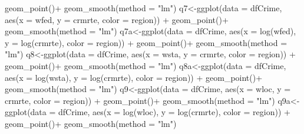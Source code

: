 \documentclass[]{article}
\newenvironment{Shaded}{}{}
\newcommand{\DataTypeTok}[1]{#1}
\newcommand{\KeywordTok}[1]{\textcolor[rgb]{0.00,0.00,1.00}{#1}}
\newcommand{\NormalTok}[1]{#1}
\newcommand{\OperatorTok}[1]{#1}
\newcommand{\StringTok}[1]{\textcolor[rgb]{0.00,0.50,0.50}{#1}}
\begin{document}
\begin{Shaded}
\begin{Highlighting}[]
\StringTok{      }\KeywordTok{geom_point}\NormalTok{()}\OperatorTok{+}
\StringTok{  }\KeywordTok{geom_smooth}\NormalTok{(}\DataTypeTok{method =} \StringTok{"lm"}\NormalTok{)}
\NormalTok{q7<-}\KeywordTok{ggplot}\NormalTok{(}\DataTypeTok{data =}\NormalTok{ dfCrime, }\KeywordTok{aes}\NormalTok{(}\DataTypeTok{x =}\NormalTok{ wfed, }\DataTypeTok{y =}\NormalTok{ crmrte, }\DataTypeTok{color =}\NormalTok{ region)) }\OperatorTok{+}\StringTok{ }
\StringTok{      }\KeywordTok{geom_point}\NormalTok{()}\OperatorTok{+}
\StringTok{  }\KeywordTok{geom_smooth}\NormalTok{(}\DataTypeTok{method =} \StringTok{"lm"}\NormalTok{)}
\NormalTok{q7a<-}\KeywordTok{ggplot}\NormalTok{(}\DataTypeTok{data =}\NormalTok{ dfCrime, }\KeywordTok{aes}\NormalTok{(}\DataTypeTok{x =} \KeywordTok{log}\NormalTok{(wfed), }\DataTypeTok{y =} \KeywordTok{log}\NormalTok{(crmrte), }\DataTypeTok{color =}\NormalTok{ region)) }\OperatorTok{+}\StringTok{ }
\StringTok{      }\KeywordTok{geom_point}\NormalTok{()}\OperatorTok{+}
\StringTok{  }\KeywordTok{geom_smooth}\NormalTok{(}\DataTypeTok{method =} \StringTok{"lm"}\NormalTok{)}
\NormalTok{q8<-}\KeywordTok{ggplot}\NormalTok{(}\DataTypeTok{data =}\NormalTok{ dfCrime, }\KeywordTok{aes}\NormalTok{(}\DataTypeTok{x =}\NormalTok{ wsta, }\DataTypeTok{y =}\NormalTok{ crmrte, }\DataTypeTok{color =}\NormalTok{ region)) }\OperatorTok{+}\StringTok{ }
\StringTok{      }\KeywordTok{geom_point}\NormalTok{()}\OperatorTok{+}
\StringTok{  }\KeywordTok{geom_smooth}\NormalTok{(}\DataTypeTok{method =} \StringTok{"lm"}\NormalTok{)}
\NormalTok{q8a<-}\KeywordTok{ggplot}\NormalTok{(}\DataTypeTok{data =}\NormalTok{ dfCrime, }\KeywordTok{aes}\NormalTok{(}\DataTypeTok{x =} \KeywordTok{log}\NormalTok{(wsta), }\DataTypeTok{y =} \KeywordTok{log}\NormalTok{(crmrte), }\DataTypeTok{color =}\NormalTok{ region)) }\OperatorTok{+}\StringTok{ }
\StringTok{      }\KeywordTok{geom_point}\NormalTok{()}\OperatorTok{+}
\StringTok{  }\KeywordTok{geom_smooth}\NormalTok{(}\DataTypeTok{method =} \StringTok{"lm"}\NormalTok{)}
\NormalTok{q9<-}\KeywordTok{ggplot}\NormalTok{(}\DataTypeTok{data =}\NormalTok{ dfCrime, }\KeywordTok{aes}\NormalTok{(}\DataTypeTok{x =}\NormalTok{ wloc, }\DataTypeTok{y =}\NormalTok{ crmrte, }\DataTypeTok{color =}\NormalTok{ region)) }\OperatorTok{+}\StringTok{ }
\StringTok{      }\KeywordTok{geom_point}\NormalTok{()}\OperatorTok{+}
\StringTok{  }\KeywordTok{geom_smooth}\NormalTok{(}\DataTypeTok{method =} \StringTok{"lm"}\NormalTok{)}
\NormalTok{q9a<-}\KeywordTok{ggplot}\NormalTok{(}\DataTypeTok{data =}\NormalTok{ dfCrime, }\KeywordTok{aes}\NormalTok{(}\DataTypeTok{x =} \KeywordTok{log}\NormalTok{(wloc), }\DataTypeTok{y =} \KeywordTok{log}\NormalTok{(crmrte), }\DataTypeTok{color =}\NormalTok{ region)) }\OperatorTok{+}\StringTok{ }
\StringTok{      }\KeywordTok{geom_point}\NormalTok{()}\OperatorTok{+}
\StringTok{  }\KeywordTok{geom_smooth}\NormalTok{(}\DataTypeTok{method =} \StringTok{"lm"}\NormalTok{)}


\end{Highlighting}
\end{Shaded}
\end{document}
